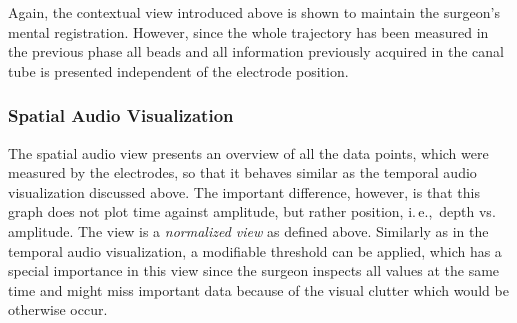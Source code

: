 \documentclass{vgtc}                          %
\begin{document}
Again, the contextual view introduced above is shown to maintain the surgeon's mental registration. However, since the whole trajectory has been measured in the previous phase all beads and all information previously acquired in the canal tube is presented independent of the electrode position. 

\subsubsection{Spatial Audio Visualization}\label{sec:overview:placement:spatialaudio}


The spatial audio view presents an overview of all the data points, which were measured by the electrodes, so that it behaves similar as the temporal audio visualization discussed above. The important difference, however, is that this graph does not plot time against amplitude, but rather position, i.\,e.,~depth vs. amplitude. The view is a \emph{normalized view} as defined above. Similarly as in the temporal audio visualization, a modifiable threshold can be applied, which has a special importance in this view since the surgeon inspects all values at the same time and might miss important data because of the visual clutter which would be otherwise occur.

%
\end{document}
